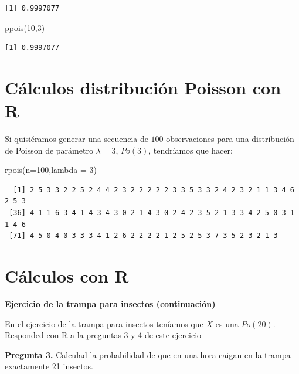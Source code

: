 \documentclass[
  letterpaper,
  DIV=11,
  numbers=noendperiod]{scrreprt}
\newenvironment{Shaded}{\begin{snugshade}}{\end{snugshade}}
\newcommand{\AttributeTok}[1]{\textcolor[rgb]{0.40,0.45,0.13}{#1}}
\newcommand{\DecValTok}[1]{\textcolor[rgb]{0.68,0.00,0.00}{#1}}
\newcommand{\FunctionTok}[1]{\textcolor[rgb]{0.28,0.35,0.67}{#1}}
\newcommand{\NormalTok}[1]{\textcolor[rgb]{0.00,0.23,0.31}{#1}}
\begin{document}
\begin{verbatim}
[1] 0.9997077
\end{verbatim}

\begin{Shaded}
\begin{Highlighting}[]
\FunctionTok{ppois}\NormalTok{(}\DecValTok{10}\NormalTok{,}\DecValTok{3}\NormalTok{)}
\end{Highlighting}
\end{Shaded}

\begin{verbatim}
[1] 0.9997077
\end{verbatim}

\section{Cálculos distribución Poisson con
R}\label{cuxe1lculos-distribuciuxf3n-poisson-con-r}

Si quisiéramos generar una secuencia de \(100\) observaciones para una
distribución de Poisson de parámetro \(\lambda=3\), \(Po(3)\),
tendríamos que hacer:

\begin{Shaded}
\begin{Highlighting}[]
\FunctionTok{rpois}\NormalTok{(}\AttributeTok{n=}\DecValTok{100}\NormalTok{,}\AttributeTok{lambda =} \DecValTok{3}\NormalTok{)}
\end{Highlighting}
\end{Shaded}

\begin{verbatim}
  [1] 2 5 3 3 2 2 5 2 4 4 2 3 2 2 2 2 2 3 3 5 3 3 2 4 2 3 2 1 1 3 4 6 2 5 3
 [36] 4 1 1 6 3 4 1 4 3 4 3 0 2 1 4 3 0 2 4 2 3 5 2 1 3 3 4 2 5 0 3 1 1 4 6
 [71] 4 5 0 4 0 3 3 3 4 1 2 6 2 2 2 2 1 2 5 2 5 3 7 3 5 2 3 2 1 3
\end{verbatim}

\section{Cálculos con R}\label{cuxe1lculos-con-r-7}

\textbf{Ejercicio de la trampa para insectos (continuación)}

En el ejercicio de la trampa para insectos teníamos que \(X\) es una
\(Po(20)\). Responded con R a la preguntas 3 y 4 de este ejercicio

\textbf{Pregunta 3.} Calculad la probabilidad de que en una hora caigan
en la trampa exactamente 21 insectos.
\end{document}
